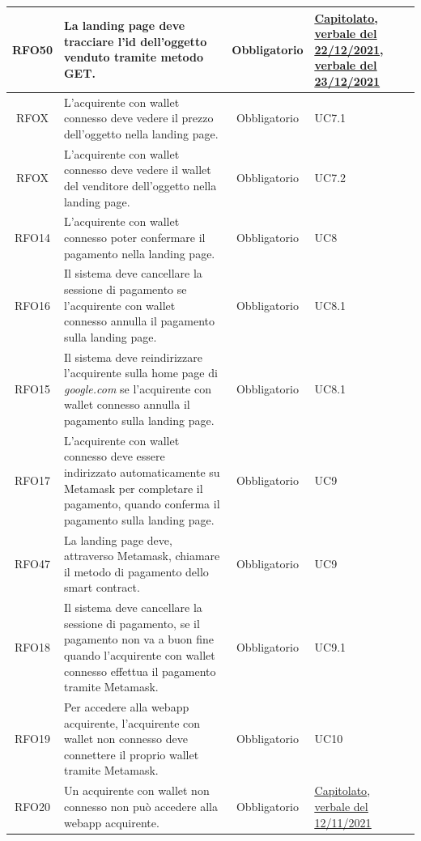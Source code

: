 \documentclass[a4paper, 12pt]{article}
\begin{document}
\begin{longtable}{|c|p{7cm}|c|p{4cm}|}
\hline
RFO50 & La landing page deve tracciare l'id dell'oggetto venduto tramite metodo GET. & Obbligatorio & \underline{\href{https://www.math.unipd.it/~tullio/IS-1/2021/Progetto/C2.pdf}{Capitolato}}, \underline{\href{https://github.com/iota97/WinningSoftwareSolution/blob/main/public/esterni/verbali/2021_12_22_E.pdf}{verbale del 22/12/2021}}, \underline{\href{https://github.com/iota97/WinningSoftwareSolution/blob/main/public/interni/verbali/2021_12_23_I.pdf}{verbale del 23/12/2021}} \\
\hline
RFOX & L'acquirente con wallet connesso deve vedere il prezzo dell'oggetto nella landing page. & Obbligatorio & UC7.1 \\
\hline
RFOX & L'acquirente con wallet connesso deve vedere il wallet del venditore dell'oggetto nella landing page. & Obbligatorio & UC7.2 \\
\hline
RFO14 & L'acquirente con wallet connesso poter confermare il pagamento nella landing page. & Obbligatorio & UC8 \\
\hline
RFO16 & Il sistema deve cancellare la sessione di pagamento se l'acquirente con wallet connesso annulla il pagamento sulla landing page. & Obbligatorio & UC8.1 \\
\hline
RFO15 & Il sistema deve reindirizzare l'acquirente sulla home page di \textit{google.com} se l'acquirente con wallet connesso annulla il pagamento sulla landing page. & Obbligatorio & UC8.1 \\
\hline
RFO17 & L'acquirente con wallet connesso deve essere indirizzato automaticamente su Metamask per completare il pagamento, quando conferma il pagamento sulla landing page. & Obbligatorio & UC9 \\
\hline
RFO47 & La landing page deve, attraverso Metamask, chiamare il metodo di pagamento dello smart contract. & Obbligatorio & UC9 \\
\hline
RFO18 & Il sistema deve cancellare la sessione di pagamento, se il pagamento non va a buon fine quando l'acquirente con wallet connesso effettua il pagamento tramite Metamask. & Obbligatorio & UC9.1 \\
\hline
RFO19 & Per accedere alla webapp acquirente, l'acquirente con wallet non connesso deve connettere il proprio wallet tramite Metamask. & Obbligatorio & UC10 \\
\hline
RFO20 & Un acquirente con wallet non connesso non può accedere alla webapp acquirente. & Obbligatorio & \underline{\href{https://www.math.unipd.it/~tullio/IS-1/2021/Progetto/C2.pdf}{Capitolato}}, \underline{\href{https://github.com/iota97/WinningSoftwareSolution/blob/main/public/interni/verbali/2021_11_12_I.pdf}{verbale del 12/11/2021}} \\

\end{longtable}
\end{document}
